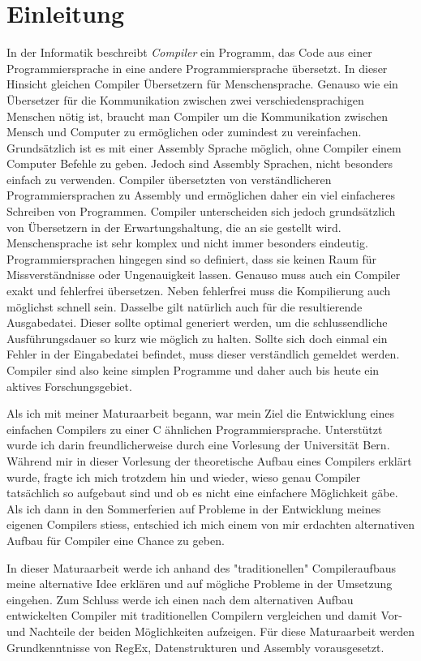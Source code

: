 \chapter{Einleitung}
In der Informatik beschreibt \textit{Compiler} ein Programm, das Code aus einer Programmiersprache in eine andere Programmiersprache übersetzt. In dieser Hinsicht gleichen Compiler Übersetzern für Menschensprache.
Genauso wie ein Übersetzer für die Kommunikation zwischen zwei verschiedensprachigen Menschen nötig ist, braucht man Compiler um die Kommunikation zwischen Mensch und Computer zu ermöglichen oder zumindest zu vereinfachen.
Grundsätzlich ist es mit einer Assembly Sprache möglich, ohne Compiler einem Computer Befehle zu geben. Jedoch sind Assembly Sprachen, nicht besonders einfach zu verwenden.
Compiler übersetzten von verständlicheren Programmiersprachen zu Assembly und ermöglichen daher ein viel einfacheres Schreiben von Programmen.
Compiler unterscheiden sich jedoch grundsätzlich von Übersetzern in der Erwartungshaltung, die an sie gestellt wird. Menschensprache ist sehr komplex und nicht immer besonders eindeutig. 
Programmiersprachen hingegen sind so definiert, dass sie keinen Raum für Missverständnisse oder Ungenauigkeit lassen. Genauso muss auch ein Compiler exakt und fehlerfrei übersetzen.
Neben fehlerfrei muss die Kompilierung auch möglichst schnell sein. Dasselbe gilt natürlich auch für die resultierende Ausgabedatei. Dieser sollte optimal generiert werden, um die schlussendliche
Ausführungsdauer so kurz wie möglich zu halten. Sollte sich doch einmal ein Fehler in der Eingabedatei befindet, muss dieser verständlich gemeldet werden. Compiler sind also keine simplen Programme und daher auch bis heute
ein aktives Forschungsgebiet.

Als ich mit meiner Maturaarbeit begann, war mein Ziel die Entwicklung eines einfachen Compilers zu einer C ähnlichen Programmiersprache. Unterstützt wurde ich darin freundlicherweise durch eine Vorlesung der Universität Bern.
Während mir in dieser Vorlesung der theoretische Aufbau eines Compilers erklärt wurde, fragte ich mich trotzdem hin und wieder, wieso genau Compiler tatsächlich so aufgebaut sind und
ob es nicht eine einfachere Möglichkeit gäbe. Als ich dann in den Sommerferien auf Probleme in der Entwicklung meines eigenen Compilers stiess, entschied ich mich einem von mir erdachten alternativen Aufbau für Compiler eine Chance zu geben. 

In dieser Maturaarbeit werde ich anhand des "traditionellen" Compileraufbaus meine alternative Idee erklären und auf mögliche Probleme in der Umsetzung eingehen.
Zum Schluss werde ich einen nach dem alternativen Aufbau entwickelten Compiler mit traditionellen Compilern vergleichen und damit Vor- und Nachteile der beiden Möglichkeiten aufzeigen.
Für diese Maturaarbeit werden Grundkenntnisse von RegEx, Datenstrukturen und Assembly vorausgesetzt.

